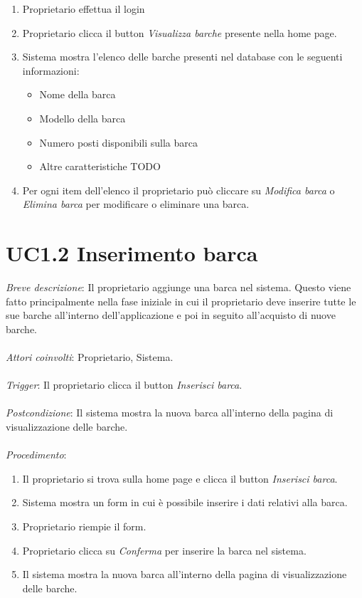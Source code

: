 \begin{enumerate}
    \item Proprietario effettua il login
    \item Proprietario clicca il button \textit{Visualizza barche} presente nella home page.
    \item Sistema mostra l'elenco delle barche presenti nel database con le seguenti informazioni:
          \begin{itemize}
              \item Nome della barca
              \item Modello della barca
              \item Numero posti disponibili sulla barca
              \item Altre caratteristiche TODO
          \end{itemize}
    \item Per ogni item dell'elenco il proprietario può cliccare su \textit{Modifica barca} o \textit{Elimina barca} per modificare o eliminare una barca.
\end{enumerate}

\section{UC1.2 Inserimento barca}

\emph{Breve descrizione}: Il proprietario aggiunge una barca nel sistema. Questo viene fatto principalmente nella fase iniziale in cui il proprietario deve inserire
tutte le sue barche all'interno dell'applicazione e poi in seguito all'acquisto di nuove barche.\\\\
\emph{Attori coinvolti}: Proprietario, Sistema.\\\\
\emph{Trigger}: Il proprietario clicca il button \textit{Inserisci barca}.\\\\
\emph{Postcondizione}: Il sistema mostra la nuova barca all'interno della pagina di visualizzazione delle barche.\\\\
\emph{Procedimento}:

\begin{enumerate}
    \item Il proprietario si trova sulla home page e clicca il button \textit{Inserisci barca}.
    \item Sistema mostra un form in cui è possibile inserire i dati relativi alla barca.
    \item Proprietario riempie il form.
    \item Proprietario clicca su \textit{Conferma} per inserire la barca nel sistema.
    \item Il sistema mostra la nuova barca all'interno della pagina di visualizzazione delle barche.
\end{enumerate}

